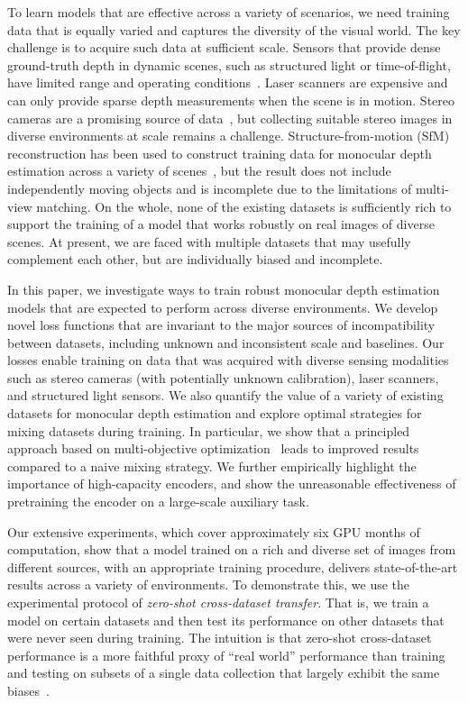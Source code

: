 To learn models that are effective across a variety of scenarios, we need training data that is equally varied and captures the diversity of the visual world. The key challenge is to acquire such data at sufficient scale. Sensors that provide dense ground-truth depth in dynamic scenes, such as structured light or time-of-flight, have limited range and operating conditions~\cite{KhoshelhamElberink2012,Hansard2013,Fankhauser2015}. Laser scanners are expensive and can only provide sparse depth measurements when the scene is in motion. Stereo cameras are a promising source of data~\cite{Garg2016,Godard2017}, but collecting suitable stereo images in diverse environments at scale remains a challenge. Structure-from-motion (SfM) reconstruction has been used to construct training data for monocular depth estimation across a variety of scenes~\cite{LiSnavely2018}, but the result does not include independently moving objects and is incomplete due to the limitations of multi-view matching. On the whole, none of the existing datasets is sufficiently rich to support the training of a model that works robustly on real images of diverse scenes. At present, we are faced with multiple datasets that may usefully complement each other, but are individually biased and incomplete.

In this paper, we investigate ways to train robust monocular depth estimation models that are expected to perform across diverse environments. We develop novel loss functions that are invariant to the major sources of incompatibility between datasets, including unknown and inconsistent scale and baselines. Our losses enable training on data that was acquired with diverse sensing modalities such as stereo cameras (with potentially unknown calibration), laser scanners, and structured light sensors. We also quantify the value of a variety of existing datasets for monocular depth estimation and explore optimal strategies for mixing datasets during training. In particular, we show that a principled approach based on multi-objective optimization~\cite{Sener2018} leads to improved results compared to a naive mixing strategy. We further empirically highlight the importance of high-capacity encoders, and show the unreasonable effectiveness of pretraining the encoder on a large-scale auxiliary task.

Our extensive experiments, which cover approximately six GPU months of computation, show that a model trained on a rich and diverse set of images from different sources, with an appropriate training procedure, delivers state-of-the-art results across a variety of environments. To demonstrate this, we use the experimental protocol of \emph{zero-shot cross-dataset transfer}. That is, we train a model on certain datasets and then test its performance on other datasets that were never seen during training. The intuition is that zero-shot cross-dataset performance is a more faithful proxy of ``real world'' performance than training and testing on subsets of a single data collection that largely exhibit the same biases~\cite{TorralbaEfros2011}.

